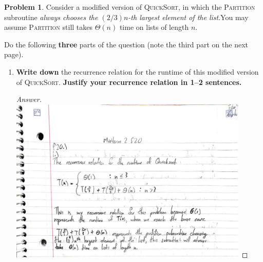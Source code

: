 \documentclass[11pt]{article}
\theoremstyle{definition}
\theoremstyle{definition}
\newtheorem{required}{Problem}
\theoremstyle{definition}
\newcommand{\standard}{20}
\begin{document}
\setcounter{required}{\standard-1}
\begin{required} 
Consider a modified version of \textsc{QuickSort}, in which the \textsc{Partition} subroutine \textit{always chooses the $(2/3)n$-th largest element of the list}.You may assume \textsc{Partition} still takes $\Theta(n)$ time on lists of length $n$.

Do the following \textbf{three} parts of the question (note the third part on the next page).

\begin{enumerate}
\item \textbf{Write down} the recurrence relation for the runtime of this modified version of \textsc{QuickSort}. \textbf{Justify your recurrence relation in 1--2 sentences.}
\begin{proof}[Answer]
\includegraphics[width=0.9\textwidth]{M2S20P1.pdf}
\end{proof}

\vspace{1in}


\end{enumerate}
\end{required}
\end{document}
